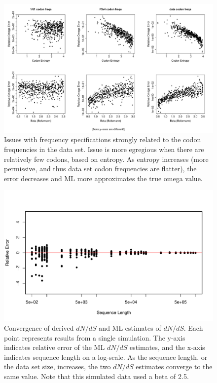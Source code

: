 \documentclass[11pt]{article}
\begin{document}
\begin{figure}[H]
\centerline{\includegraphics[width=6in]{figures/freqspec_beta_s_error.pdf}}
\caption{\label{freq_s_error} Issues with frequency specifications strongly related to the codon frequencies in the data set. Issue is more egregious when there are relatively few codons, based on entropy. As entropy increases (more permissive, and thus data set codon frequencies are flatter), the error decreases and ML more approximates the true omega value.}
\end{figure}


\begin{figure}[H]
\centerline{\includegraphics[width=6in]{figures/convergence.pdf}}
\caption{\label{conv} Convergence of derived $dN/dS$ and ML estimates of $dN/dS$. Each point represents results from a single simulation. The y-axis indicates relative error of the ML $dN/dS$ estimates, and the x-axis indicates sequence length on a log-scale. As the sequence length, or the data set size, increases, the two $dN/dS$ estimates converge to the same value. Note that this simulated data used a beta of 2.5.}
\end{figure}
\end{document}
